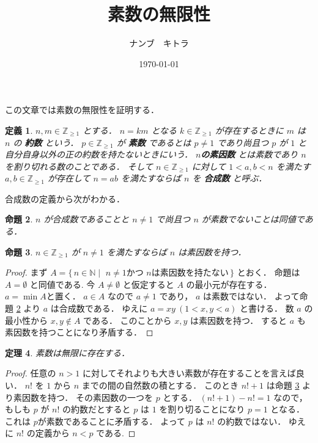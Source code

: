 \documentclass[leqno, a4paper, 12pt]{ltjsarticle}
\title{素数の無限性}
\author{ナンブ　キトラ}
\date{\today}
\newtheorem{thm}{定理}
\newtheorem{prop}[thm]{命題}
\newtheorem{df}[thm]{定義}
\newcommand{\zz}{\mathbb{Z}}
\begin{document}
\maketitle
この文章では素数の無限性を証明する．
\begin{df}
$n, m\in \zz_{\ge 1}$
とする．
$n=km$
となる
$k\in \zz_{\ge 1}$
が存在するときに
$m$
は
$n$
の
\textbf{約数}
という．
$p\in \zz_{\ge 1}$
が
\textbf{素数}
であるとは
$p\neq 1$
であり尚且つ
$p$
が
$1$
と自分自身以外の正の約数を持たないときにいう．
\textbf{$n$の素因数}
とは素数であり
$n$
を割り切れる数のことである．
そして
$n\in \zz_{\ge 1}$
に対して
$1<a, b<n$
を満たす
$a, b\in \zz_{\ge 1}$
が存在して
$n=ab$
を満たすならば
$n$
を
\textbf{合成数}
と呼ぶ．
\end{df}
合成数の定義から次がわかる．
\begin{prop}\label{nab}
$n$
が合成数であることと
$n\neq 1$
で尚且つ
$n$
が素数でないことは同値である．
\end{prop}

\begin{prop}\label{soinsuu}
$n\in \zz_{\ge 1}$
が
$n\neq 1$
を満たすならば
$n$
は素因数を持つ．
\end{prop}
\begin{proof}
まず
$A =\{\,  n\in \mathbb{N}
\mid
\text{
 $n\neq1$
 かつ
 $n$
 は素因数を持たない}
 \, \}$
とおく．
命題は
$A= \emptyset$
と同値である.
今
$A\neq \emptyset$
と仮定すると
$A$
の最小元が存在する．
$a=\min A$と置く．
$a\in A$
なので
$a\neq 1$
であり，
$a$
は素数ではない．
よって命題
\ref{nab}
より
$a$
は合成数である．
ゆえに
$a=xy\ (1<x,y<a)$
と書ける．
数
$a$
の最小性から
$x,y\not\in A$
である．
このことから
$x,y$
は素因数を持つ．
すると
$a$
も素因数を持つことになり矛盾する．
\end{proof}


\begin{thm}
素数は無限に存在する．
\end{thm}
\begin{proof}
任意の
$n>1$
に対してそれよりも大きい素数が存在することを言えば良い．
$n!$
を
$1$
から
$n$
までの間の自然数の積とする．
このとき
$n!+1$
は命題
\ref{soinsuu}
より素因数を持つ．
その素因数の一つを
$p$
とする．
$(n!+1)-n!=1$
なので，
もしも
$p$
が
$n!$
の約数だとすると
$p$
は
$1$
を割り切ることになり
$p=1$
となる．
これは
$p$が素数であることに矛盾する．
よって
$p$
は
$n!$
の約数ではない．
ゆえに
$n!$
の定義から
$n<p$
である.
\end{proof}
\end{document}
